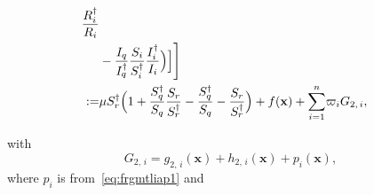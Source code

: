 \documentclass[a4paper]{article}
\newcommand{\dsum}{\displaystyle\sum}
\begin{document}
\begin{align}
\frac{R^\dagger_i}{R_i} \nonumber\\&- \frac{I_q}{I^\dagger _q} \frac{S_i}{S^\dagger _i}\frac{I^\dagger _i}{I_i}\Big)\Big] \Bigg]\nonumber\hfill\\
:=&   \mu S^\dagger _r  \Big(1 + \frac{S^\dagger _q}{S_q}\frac{S_r}{S_r^\dagger } - \frac{S^\dagger _q}{S_q}-\frac{S_r}{S_r^\dagger }\Big)  + f(\mathbf x)+{\dsum_{i=1}^n}\varpi_i G_{2,\,i},
\label{eq:eqliapeeder21}
\end{align}

with
\begin{equation}\label{eq:G2exp2}
G_{2,\,i} = g_{2,\,i}(\mathbf x)+h_{2,\,i}(\mathbf x)+p_{i}(\mathbf x),
\end{equation}
where $p_i$ is from~\eqref{eq:frgmtliap1} and 

\begin{align}

\end{align}
\end{document}
